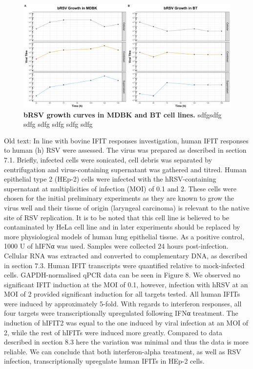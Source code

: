 \begin{figure}
    \centering
    \includegraphics[width=1\linewidth]{07. Chapter 2/Figs/01. Technologies/01. growth_curves.pdf}
    \caption[bRSV growth curves in MDBK and BT cell lines.]{\textbf{bRSV growth curves in MDBK and BT cell lines.} sdfgsdfg sdfg sdfg sdfg sdfg sdfg }
    \label{bRSV growth curves in MDBK and BT cell lines}
\end{figure}


Old text:
In line with bovine IFIT responses investigation, human IFIT responses to human (h) RSV were assessed. The virus was prepared as described in section 7.1. Briefly, infected cells were sonicated, cell debris was separated by centrifugation and virus-containing supernatant was gathered and titred. Human epithelial type 2 (HEp-2) cells were infected with the hRSV-containing supernatant at multiplicities of infection (MOI) of 0.1 and 2. These cells were chosen for the initial preliminary experiments as they are known to grow the virus well and their tissue of origin (laryngeal carcinoma) is relevant to the native site of RSV replication. It is to be noted that this cell line is believed to be contaminated by HeLa cell line and in later experiments should be replaced by more physiological models of human lung epithelial tissue. As a positive control, 1000 U of hIFNα was used. Samples were collected 24 hours post-infection. Cellular RNA was extracted and converted to complementary DNA, as described in section 7.3. Human IFIT transcripts were quantified relative to mock-infected cells. GAPDH-normalised qPCR data can be seen in Figure 8. We observed no significant IFIT induction at the MOI of 0.1, however, infection with hRSV at an MOI of 2 provided significant induction for all targets tested. All human IFITs were induced by approximately 5-fold. With regards to interferon responses, all four targets were transcriptionally upregulated following IFNα treatment. The induction of hIFIT2 was equal to the one induced by viral infection at an MOI of 2, while the rest of hIFITs were induced more greatly. Compared to data described in section 8.3 here the variation was minimal and thus the data is more reliable. We can conclude that both interferon-alpha treatment, as well as RSV infection, transcriptionally upregulate human IFITs in HEp-2 cells.

